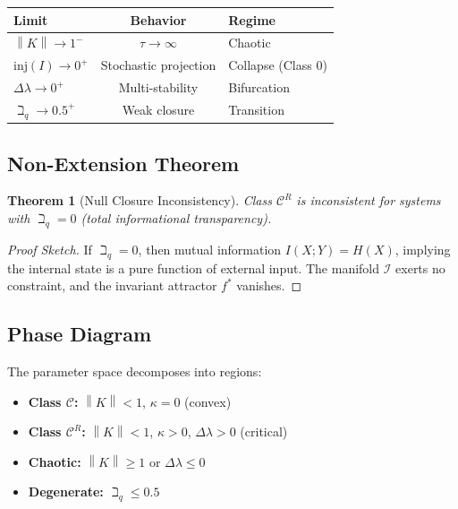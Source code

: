 \documentclass[11pt,a4paper]{article}
\theoremstyle{plain}
\newtheorem{theorem}{Theorem}[section]
\theoremstyle{definition}
\newcommand{\I}{\mathcal{I}}
\newcommand{\norm}[1]{\left\lVert #1 \right\rVert}
\begin{document}
\begin{center}
\begin{tabular}{|l|c|l|}
\hline
\textbf{Limit} & \textbf{Behavior} & \textbf{Regime} \\
\hline
$\norm{K} \to 1^-$ & $\tau \to \infty$ & Chaotic \\
$\text{inj}(I) \to 0^+$ & Stochastic projection & Collapse (Class 0) \\
$\Delta\lambda \to 0^+$ & Multi-stability & Bifurcation \\
$\beth_q \to 0.5^+$ & Weak closure & Transition \\
\hline
\end{tabular}
\end{center}

\subsection{Non-Extension Theorem}

\begin{theorem}[Null Closure Inconsistency]\label{thm:no-extend}
Class $\mathscr{C}^R$ is inconsistent for systems with $\beth_q = 0$ (total informational transparency).
\end{theorem}

\begin{proof}[Proof Sketch]
If $\beth_q = 0$, then mutual information $I(X; Y) = H(X)$, implying the internal state is a pure function of external input. The manifold $\I$ exerts no constraint, and the invariant attractor $f^*$ vanishes.
\end{proof}

\subsection{Phase Diagram}

The parameter space decomposes into regions:
\begin{itemize}
    \item \textbf{Class $\mathscr{C}$:} $\norm{K} < 1$, $\kappa = 0$ (convex)
    \item \textbf{Class $\mathscr{C}^R$:} $\norm{K} < 1$, $\kappa > 0$, $\Delta\lambda > 0$ (critical)
    \item \textbf{Chaotic:} $\norm{K} \geq 1$ or $\Delta\lambda \leq 0$
    \item \textbf{Degenerate:} $\beth_q \leq 0.5$
\end{itemize}

\end{document}
